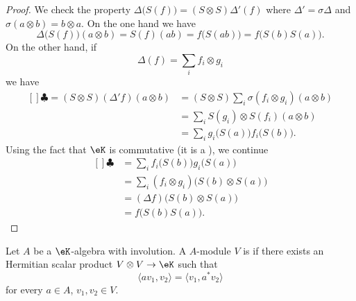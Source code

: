 \begin{proof}
	We check the property \( \Delta\big( S(f) \big)=(S\otimes S)\Delta'(f)\) where \( \Delta'=\sigma\Delta\) and \( \sigma(a\otimes b)=b\otimes a\). On the one hand we have
	\begin{equation}
		\Delta\big( S(f) \big)(a\otimes b)=S(f)(ab)=f\big( S(ab) \big)=f\big( S(b)S(a) \big).
	\end{equation}
	On the other hand, if
	\begin{equation}
		\Delta(f)=\sum_i f_i\otimes g_i
	\end{equation}
	we have
	\begin{equation}
		\begin{aligned}[]
			\clubsuit=(S\otimes S)(\Delta'f)(a\otimes b) & =(S\otimes S)\sum_i\sigma(f_i\otimes g_i)(a\otimes b) \\
			                                             & =\sum_iS(g_i)\otimes S(f_i)(a\otimes b)               \\
			                                             & =\sum_i g_i\big( S(a) \big)f_i\big( S(b) \big).
		\end{aligned}
	\end{equation}
	Using the fact that \( \eK\) is commutative (it is a ), we continue
	\begin{equation}
		\begin{aligned}[]
			\clubsuit & =\sum_i f_i\big( S(b) \big)g_i\big( S(a) \big)      \\
			          & =\sum_i(f_i\otimes g_i)\big( S(b)\otimes S(a) \big) \\
			          & =(\Delta f)\big( S(b)\otimes S(a) \big)             \\
			          & =f\big( S(b)S(a) \big).
		\end{aligned}
	\end{equation}
\end{proof}

\begin{definition}      \label{DefInvolutionHopf}
	Let \( A\) be a \( \eK\)-algebra with involution. A \( A\)-module \( V\) is  if there exists an Hermitian scalar product \( V\otimes V\to\eK\) such that
	\begin{equation}
		\langle av_1, v_2\rangle =\langle v_1, a^*v_2\rangle
	\end{equation}
	for every \( a\in A\), \( v_1,v_2\in V\).
\end{definition}

